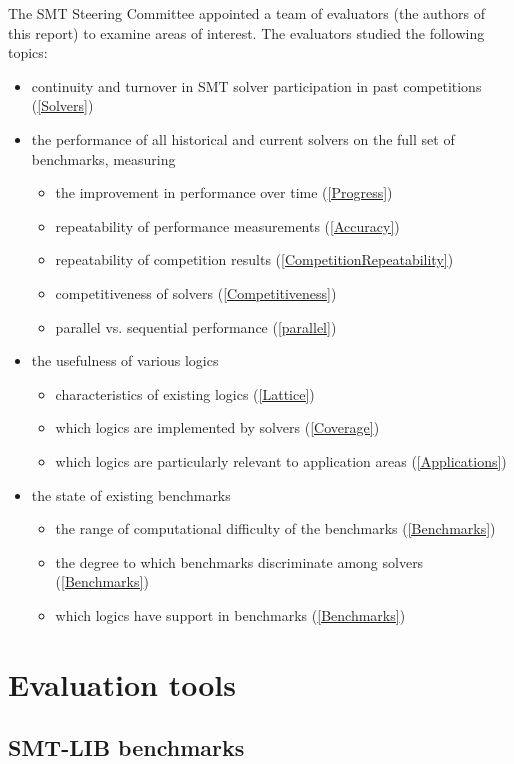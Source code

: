 \documentclass{eptcs}
\begin{document}
The SMT Steering Committee appointed a team of evaluators (the authors
of this report) to examine areas of interest. The evaluators studied
the following topics:
\begin{itemize}[noitemsep]
\item continuity and turnover in SMT solver participation in past competitions (\ref{Solvers})
\item the performance of all historical and current solvers on the full set of benchmarks, measuring
\begin{itemize}[noitemsep]
\item the improvement in performance over time (\ref{Progress})
\item repeatability of performance measurements (\ref{Accuracy})
\item repeatability of competition results (\ref{CompetitionRepeatability})
\item competitiveness of solvers (\ref{Competitiveness})
\item parallel vs. sequential performance (\ref{parallel})
\end{itemize}
\item the usefulness of various logics
\begin{itemize}[noitemsep]
\item characteristics of existing logics (\ref{Lattice})
\item which logics are implemented by solvers (\ref{Coverage})
\item which logics are particularly relevant to application areas (\ref{Applications})
\end{itemize}
\item the state of existing benchmarks
\begin{itemize}[noitemsep]
\item the range of computational difficulty of the benchmarks (\ref{Benchmarks})
\item the degree to which benchmarks discriminate among solvers (\ref{Benchmarks})
\item which logics have support in benchmarks (\ref{Benchmarks})
\end{itemize}

\end{itemize}


\section{Evaluation tools}

\subsection{SMT-LIB benchmarks}
\end{document}
